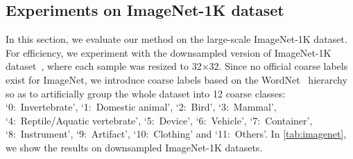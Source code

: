 \documentclass[10pt,twocolumn,letterpaper]{article}
\begin{document}
\subsection{Experiments on ImageNet-1K dataset}\label{exp:in1k}
In this section, we evaluate our method on the large-scale ImageNet-1K dataset. For efficiency, we experiment with the downsampled version of ImageNet-1K dataset~\cite{chrabaszcz2017downsampled}, where each sample was resized to 32$\times$32. 
Since no official coarse labels exist for ImageNet, we introduce coarse labels based on the WordNet~\cite{miller1998wordnet} hierarchy so as to artificially group the whole dataset into 12 coarse classes: `0:~Invertebrate', `1:~Domestic animal', `2:~Bird', `3:~Mammal', `4:~Reptile/Aquatic vertebrate', `5:~Device', `6:~Vehicle', `7:~Container', `8:~Instrument', `9:~Artifact', `10:~Clothing' and `11:~Others'. In \cref{tab:imagenet}, we show the results on downsampled ImageNet-1K datasets. 

\begin{table}[htbp]
\centering
{}
\caption{Results on ImageNet-1K dataset.}
\label{tab:imagenet}
\end{table}
\end{document}
